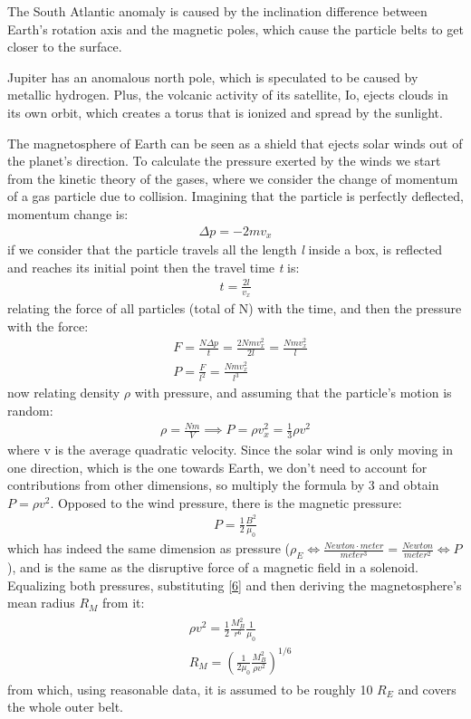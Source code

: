 \documentclass[12pt,a4paper]{article}
\begin{document}
The South Atlantic anomaly is caused by the inclination difference between Earth's rotation axis and the magnetic poles, which cause the particle belts to get closer to the surface.

Jupiter has an anomalous north pole, which is speculated to be caused by metallic hydrogen. Plus, the volcanic activity of its satellite, Io, ejects clouds in its own orbit, which creates a torus that is ionized and spread by the sunlight.

The magnetosphere of Earth can be seen as a shield that ejects solar winds out of the planet's direction. To calculate the pressure exerted by the winds we start from the kinetic theory of the gases, where we consider the change of momentum of a gas particle due to collision. Imagining that the particle is perfectly deflected, momentum change is:
\begin{align}
    \Delta p=-2mv_x
\end{align}
if we consider that the particle travels all the length \textit{l} inside a box, is reflected and reaches its initial point then the travel time \textit{t} is:
\begin{align}
    t=\frac{2l}{v_x}
\end{align}
relating the force of all particles (total of N) with the time, and then the pressure with the force:
\begin{align}
    &F=\frac{N\Delta p}{t}=\frac{2Nmv_x^2}{2l}=\frac{Nmv^2_x}{l} \\
    &P=\frac{F}{l^2}=\frac{Nmv^2_x}{l^3}
\end{align}
now relating density $\rho$ with pressure, and assuming that the particle's motion is random:
\begin{align}
    \rho=\frac{Nm}{V}\implies P=\rho v_x^2=\frac{1}{3}\rho v^2
\end{align}
where v is the average quadratic velocity. Since the solar wind is only moving in one direction, which is the one towards Earth, we don't need to account for contributions from other dimensions, so multiply the formula by 3 and obtain $P=\rho v^2$. Opposed to the wind pressure, there is the magnetic pressure:
\begin{align}
    P=\frac{1}{2}\frac{B^2}{\mu_0}
\end{align}
which has indeed the same dimension as pressure ($\rho_E\Leftrightarrow\frac{Newton\cdot meter}{meter^3}=\frac{Newton}{meter^2}\Leftrightarrow P$), and is the same as the disruptive force of a magnetic field in a solenoid. Equalizing both pressures, substituting \eqref{6} and then deriving the magnetosphere's mean radius $R_M$ from it: 
\begin{align}
\begin{split}
    &\rho v^2=\frac{1}{2}\frac{M_B^2}{r^6}\frac{1}{\mu_0} \\
    &R_M=(\frac{1}{2\mu_0}\frac{M_B^2}{\rho v^2})^{1/6}
\end{split}
\end{align}
from which, using reasonable data, it is assumed to be roughly 10 $R_E$ and covers the whole outer belt.
\end{document}
